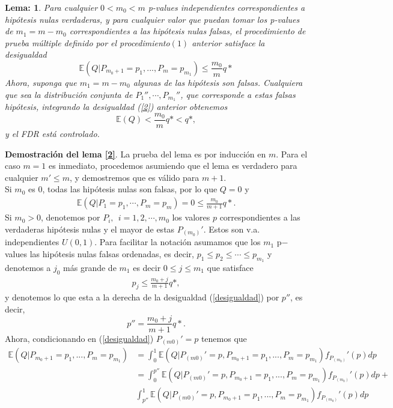 \documentclass[11pt,letterpaper]{article}
\newcommand{\mE}{\mathbb{E}}
\newtheorem{thml}{Lema:}
\begin{document}
\begin{framed}
    \begin{thml} \label{l_1}
Para cualquier $0 <m_0 <m$ p-values independientes correspondientes a hipótesis nulas verdaderas, y para cualquier valor que puedan tomar los p-values de $m_1= m - m_0$ correspondientes a las hipótesis nulas falsas, el procedimiento de prueba múltiple definido por el procedimiento$(1)$ anterior satisface la desigualdad
\begin{equation}\label{2}
\mE (Q | P_{m_0+1}=p_1, ..., P_m = p_{m_1})\leq \frac{m_0}{m} q *
\end{equation}
Ahora, suponga que $m_1=m-m_0$ algunas de las hipótesis son falsas. Cualquiera que sea la distribución conjunta de $P_1'' ,\cdots, P_{m_1}''$, que corresponde a estas falsas hipótesis, integrando la desigualdad (\ref{2}) anterior obtenemos
\begin{equation*}
\mE(Q) <\frac{m_0}{m}q* <q *,
\end{equation*}
y el FDR está controlado.
    \end{thml}
\end{framed}
\textbf{Demostración del lema \ref{2}}. La prueba del lema es por inducción en $m$. Para el caso $m=1$ es inmediato, procedemos asumiendo que el lema es verdadero para cualquier $m'\leq m$, y demostremos que es válido para $m+1$. \\
Si $m_0$ es 0, todas las hipótesis nulas son falsas, por lo que $Q=0$ y 
\begin{align*}
\mE(Q|P_1=p_1,\cdots, P_m=p_m)=0 \leq \frac{m_0}{m+1}q*.
\end{align*} 
Si $m_0>0$, denotemos por $P_i, \ \ i=1,2,\cdots, m_0$ los valores $p$ correspondientes a las verdaderas hipótesis nulas y el mayor de estas $P_{(m_0)}'$. Estos son v.a. independientes $U(0,1)$. Para facilitar la notación asumamos que los $m_1$ p$-$values las hipótesis nulas falsas ordenadas, es decir, $p_1\leq p_2 \leq \cdots \leq p_{m_1}$ y denotemos a $j_0$ más grande de $m_1$ es decir $0\leq j\leq m_1$ que satisface
\begin{align*}\label{desigualdad}
p_j\leq \frac{m_0+j}{m+1}q*,
\end{align*}
y denotemos lo que esta a la derecha de la desigualdad (\ref{desigualdad}) por $p''$, es decir, $$p''=\frac{m_0+j}{m+1}q*.$$
Ahora, condicionando en (\ref{desigualdad}) $P_{(m0)}'=p$ tenemos que 
\begin{align}
\mE (Q | P_{m_0+1}=p_1, ..., P_m = p_{m_1})&=\int_0^1 \mE (Q | P_{(m0)}'=p, P_{m_0+1}=p_1, ..., P_m = p_{m_1}) f_{P_{(m_0)}}'(p)dp\\
&=\int_0^{p''} \mE (Q | P_{(m0)}'=p, P_{m_0+1}=p_1, ..., P_m = p_{m_1}) f_{P_{(m_0)}}'(p)dp+\\
&\int_{p''}^1 \mE (Q | P_{(m0)}'=p, P_{m_0+1}=p_1, ..., P_m = p_{m_1}) f_{P_{(m_0)}}'(p)dp
\end{align} 
\end{document}
